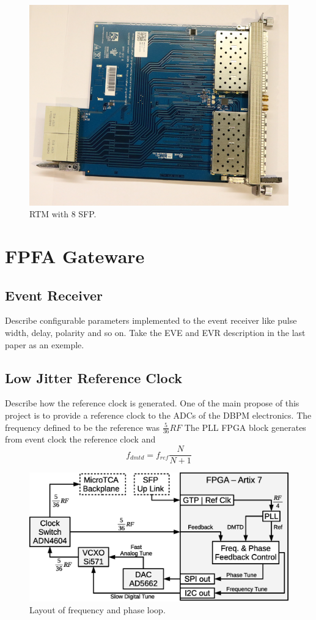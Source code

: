 \documentclass[a4paper,
               biblatex,      %
               ]{jacow}
\begin{document}
\begin{figure}[!htb]
   \centering
   \includegraphics*[width=0.8\columnwidth]{RTM_SFP_resized}
   \caption{RTM with 8 SFP.}
   \label{fig:rtm_sfp}
\end{figure}

\section{FPFA Gateware}

\subsection{Event Receiver}

Describe configurable parameters implemented to the event receiver like pulse width, delay, polarity and so on. Take the EVE and EVR description in the last paper as an exemple.

\subsection{Low Jitter Reference Clock}
Describe how the reference clock is generated.
One of the main propose of this project is to provide a reference clock to the ADCs of the DBPM electronics. The frequency defined to be the reference was $\frac{5}{36}RF$
The PLL FPGA block generates from event clock the reference clock and  
\[f_{dmtd} = f_{ref}\frac{N}{N+1}\]

\begin{figure}[!htb]
   \centering
   \includegraphics*[width=0.8\columnwidth]{AFCRefClockLoop}
   \caption{Layout of frequency and phase loop.}
   \label{fig:AFCRefClockLoop}
\end{figure}
\end{document}
